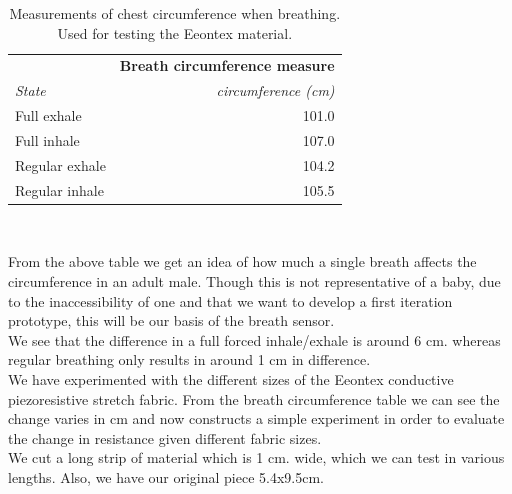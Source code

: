 \documentclass{sigchi-ext}
\begin{document}
\begin{table}
  \centering
  \begin{tabular}{l r}
    & \multicolumn{1}{l}{\small{\textbf{Breath circumference measure}}} \\
    \cmidrule(r){1-2}
    {\small\textit{State}}
    & {\small \textit{circumference (cm)}} \\
    \midrule
    Full exhale    & 101.0 \\
    Full inhale    & 107.0 \\
    Regular exhale & 104.2 \\
    Regular inhale & 105.5  \\
  \end{tabular}
  \caption{Measurements of chest circumference when breathing. Used for testing the Eeontex material.}~\label{tab:circumference}
\end{table}

From the above table we get an idea of how much a single breath affects the circumference
in an adult male. Though this is not representative of a baby, due to the 
inaccessibility of one and that we want to develop a first iteration prototype, this
will be our basis of the breath sensor.\\
We see that the difference in a full forced inhale/exhale is around 6 cm. whereas regular
breathing only results in around 1 cm in difference.\\
We have experimented with the different sizes of the Eeontex conductive piezoresistive 
stretch fabric. From the breath circumference table we can see the change varies in cm and
now constructs a simple experiment in order to evaluate the change in resistance given 
different fabric sizes.\\
We cut a long strip of material which is 1 cm. wide, which we can test in various lengths.
Also, we have our original piece 5.4x9.5cm.
\end{document}
